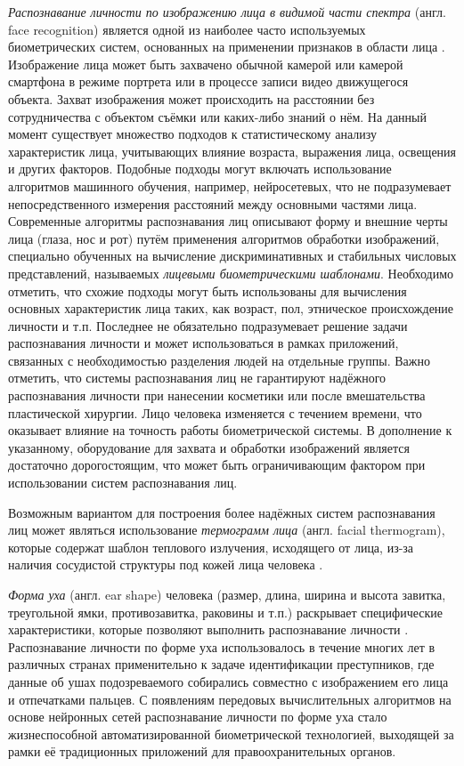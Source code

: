\documentclass[12pt]{book}
\begin{document}
\large{\textit{Распознавание личности по изображению лица в видимой части спектра} (англ. face recognition) является одной из наиболее часто используемых биометрических систем, основанных на применении признаков в области лица \cite{unar_2014, minaee_2023, wang_2022}. Изображение лица может быть захвачено обычной камерой или камерой смартфона в режиме портрета или в процессе записи видео движущегося объекта. Захват изображения может происходить на расстоянии без сотрудничества с объектом съёмки или каких-либо знаний о нём. На данный момент существует множество подходов к статистическому анализу характеристик лица, учитывающих влияние возраста, выражения лица, освещения и других факторов. Подобные подходы могут включать использование алгоритмов машинного обучения, например, нейросетевых, что не подразумевает непосредственного измерения расстояний между основными частями лица. Современные алгоритмы распознавания лиц описывают форму и внешние черты лица (глаза, нос и рот) путём применения алгоритмов обработки изображений, специально обученных на вычисление дискриминативных и стабильных числовых представлений, называемых \textit{лицевыми биометрическими шаблонами}. Необходимо отметить, что схожие подходы могут быть использованы для вычисления основных характеристик лица таких, как возраст, пол, этническое происхождение личности и т.п. Последнее не обязательно подразумевает решение задачи распознавания личности и может использоваться в рамках приложений, связанных с необходимостью разделения людей на отдельные группы. Важно отметить, что системы распознавания лиц не гарантируют надёжного распознавания личности при нанесении косметики или после вмешательства пластической хирургии. Лицо человека изменяется с течением времени, что оказывает влияние на точность работы биометрической системы. В дополнение к указанному, оборудование для захвата и обработки изображений является достаточно дорогостоящим, что может быть ограничивающим фактором при использовании систем распознавания лиц.}

\large{Возможным вариантом для построения более надёжных систем распознавания лиц может являться использование \textit{термограмм лица} (англ. facial thermogram), которые содержат шаблон теплового излучения, исходящего от лица, из-за наличия сосудистой структуры под кожей лица человека \cite{unar_2014, lin_2021}.}

\large{\textit{Форма уха} (англ. ear shape) человека (размер, длина, ширина и высота завитка, треугольной ямки, противозавитка, раковины и т.п.) раскрывает специфические характеристики, которые позволяют выполнить распознавание личности \cite{unar_2014, minaee_2023}. Распознавание личности по форме уха использовалось в течение многих лет в различных странах применительно к задаче идентификации преступников, где данные об ушах подозреваемого собирались совместно с изображением его лица и отпечатками пальцев. С появлениям передовых вычислительных алгоритмов на основе нейронных сетей распознавание личности по форме уха стало жизнеспособной автоматизированной биометрической технологией, выходящей за рамки её традиционных приложений для правоохранительных органов.}
\end{document}
